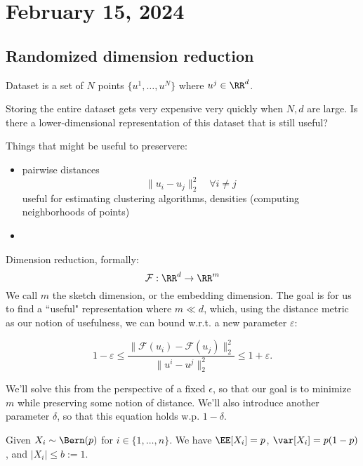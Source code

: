 \section{February 15, 2024}

\subsection{Randomized dimension reduction}

\begin{example}
\exlabel

Dataset is a set of $N$ points $\{u^1, \hdots, u^N\}$ where $u^j\in \RR^{d}$. 
\end{example}

Storing the entire dataset gets very expensive very quickly when $N,d$ are large. Is there a lower-dimensional representation of this dataset that is still useful? 

Things that might be useful to preservere: 
\begin{itemize}
	\item pairwise distances 
		\[\lVert u_i - u_j\rVert_2^2\quad \forall i\neq j\] 
		useful for estimating clustering algorithms, densities (computing neighborhoods of points)
	\item  
\end{itemize}

Dimension reduction, formally: 
\[\mathcal{F} : \RR^d\rightarrow \RR^m\] 
We call $m$ the \ac{sketch dimension}, or the \ac{embedding dimension}. The goal is for us to find a ``useful" representation where $m \ll d$, which, using the distance metric as our notion of usefulness, we can bound w.r.t. a new parameter $\varepsilon$:  

\[1 - \varepsilon \leq \frac{\lVert \mathcal{F}(u_i) - \mathcal{F}(u_j)\rVert_2^2}{\lVert u^i - u^j\rVert_2^2} \leq 1 + \varepsilon.\]

We'll solve this from the perspective of a fixed $\epsilon$, so that our goal is to minimize $m$ while preserving some notion of distance. We'll also introduce another parameter $\delta$, so that this equation holds w.p. $1-\delta$.

\begin{example}

Given $X_i\sim \Bern(p)$ for $i\in \{1,\hdots,n\}$. We have $\EE[X_i]=p$, $\var[X_i]=p(1-p)$, and $\vert X_i\vert\leq b:=1$. 
\end{example}


